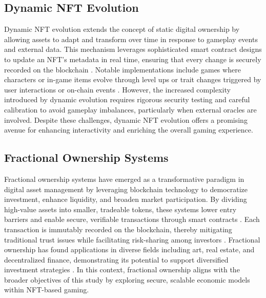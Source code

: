 \subsection{Dynamic NFT Evolution}

Dynamic NFT evolution extends the concept of static digital ownership by
allowing assets to adapt and transform over time in response to gameplay events
and external data. This mechanism leverages sophisticated smart contract designs
to update an NFT’s metadata in real time, ensuring that every change is securely
recorded on the blockchain \cite{barbaraguidiNFT10NFT2023}. Notable implementations include games where characters or in-game items
evolve through level ups or trait changes triggered by user interactions or
on-chain events  \cite{oliverjamesscholtenEthereumCryptoGamesMechanics2019,
	patelBlockchainGamingBuilding2023}. However, the increased complexity introduced by
dynamic evolution requires rigorous security testing and careful calibration to
avoid gameplay imbalances, particularly when external oracles are involved.
Despite these challenges, dynamic NFT evolution offers a promising avenue for
enhancing interactivity and enriching the overall gaming experience.

\subsection{Fractional Ownership Systems}

Fractional ownership systems have emerged as a transformative paradigm in
digital asset management by leveraging blockchain technology to democratize
investment, enhance liquidity, and broaden market participation. By dividing
high-value assets into smaller, tradeable tokens, these systems lower entry
barriers and enable secure, verifiable transactions through smart contracts
\cite{popescuNonFungibleTokensNFT2021, michiNFTArtRestrained2022}. Each
transaction is immutably recorded on the blockchain, thereby mitigating
traditional trust issues while facilitating risk-sharing among investors
\cite{duguleanaEmergingTrendsPlaytoEarn2024, barbaraguidiNFT10NFT2023}. Fractional ownership has found applications in diverse fields including
art, real estate, and decentralized finance, demonstrating its potential to
support diversified investment strategies \cite{michiNFTArtRestrained2022,
	marinReviewBlockchainTokens2023}. In this context,
fractional ownership aligns with the broader objectives of this study by
exploring secure, scalable economic models within NFT-based gaming.


